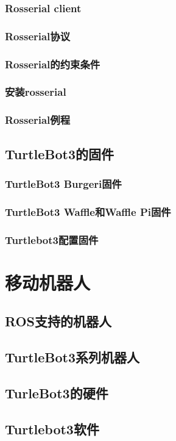 \documentclass[geye,green,kindle,cn]{elegantnote}
\begin{document}
\subsubsection{Rosserial client}
\subsubsection{Rosserial协议}
\subsubsection{Rosserial的约束条件}
\subsubsection{安装rosserial}
\subsubsection{Rosserial例程}
\subsection{TurtleBot3的固件}
\subsubsection{TurtleBot3 Burgeri固件}
\subsubsection{TurtleBot3 Waffle和Waffle Pi固件}
\subsubsection{Turtlebot3配置固件}
\section{移动机器人}
\subsection{ROS支持的机器人}
\subsection{TurtleBot3系列机器人}
\subsection{TurleBot3的硬件}
\subsection{Turtlebot3软件}
\end{document}
